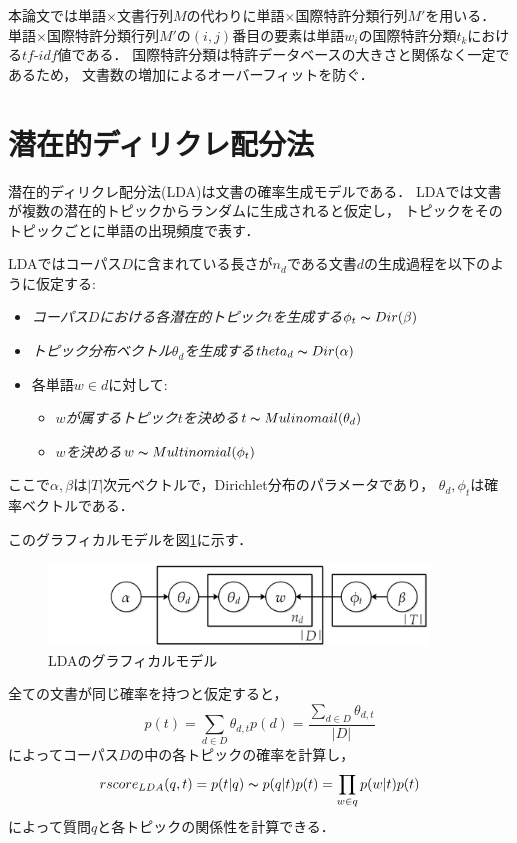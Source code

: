 \documentclass[master]{suribt}
\theoremstyle{definition}
\begin{document}
 本論文では単語$\times$文書行列$M$の代わりに単語$\times$国際特許分類行列$M'$を用いる．
 単語$\times$国際特許分類行列$M'$の$(i,j)$番目の要素は単語$w_i$の国際特許分類$t_k$における$tf\text{-}idf$値である．
 国際特許分類は特許データベースの大きさと関係なく一定であるため，
 文書数の増加によるオーバーフィットを防ぐ．

 \section{潜在的ディリクレ配分法}
 潜在的ディリクレ配分法(LDA)は文書の確率生成モデルである．
 LDAでは文書が複数の潜在的トピックからランダムに生成されると仮定し，
 トピックをそのトピックごとに単語の出現頻度で表す．

 
 LDAではコーパス$D$に含まれている長さが$n_d$である文書$d$の生成過程を以下のように仮定する:
 \begin{itemize}
 \item {\em コーパス$D$における各潜在的トピック$t$を生成する}$\phi_{t} \thicksim Dir(\beta)$
 \item {\em トピック分布ベクトル$\theta_d$を生成する}$theta_d \thicksim Dir(\alpha)$
 \item 各単語$w \in d$に対して:
  \begin{itemize}
   \item {\em $w$が属するトピック$t$を決める}$t \thicksim Mulinomail(\theta_d)$
   \item {\em $w$を決める}$w \thicksim Multinomial(\phi_{t})$
  \end{itemize}
 \end{itemize}
 
 ここで$\alpha,\beta$は$|T|$次元ベクトルで，Dirichlet分布のパラメータであり，
 $\theta_d,\phi_{t}$は確率ベクトルである．

 このグラフィカルモデルを図\ref{fig:LDA}に示す．
 \begin{figure}
 \includegraphics[width=0.9\textwidth,natwidth=557,natheight=141]{LDA.png}
 \caption{LDAのグラフィカルモデル}
 \label{fig:LDA}
 \end{figure}
 
 全ての文書が同じ確率を持つと仮定すると，
 \begin{equation}
 p(t) = \sum_{d \in D}\theta_{d,t}p(d) = \frac{\sum_{d \in D} \theta_{d,t}}{|D|}
 \end{equation}
 によってコーパス$D$の中の各トピックの確率を計算し，
 \begin{equation}
 rscore_{LDA}(q,t) = p(t|q) \thicksim p(q|t)p(t) = \prod_{w \in q}p(w|t)p(t)
 \end{equation}
 によって質問$q$と各トピックの関係性を計算できる．
\end{document}

